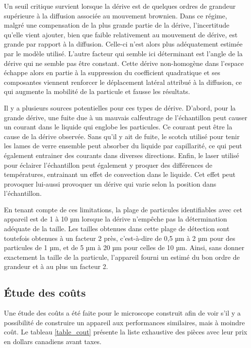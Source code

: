 \documentclass[11pt,letterpaper]{article}
\begin{document}
Un seuil critique survient lorsque la dérive est de quelques ordres de grandeur supérieure à la 
diffusion associée au mouvement brownien. Dans ce régime, malgré une 
compensation de la plus grande partie de la dérive, l'incertitude qu'elle vient ajouter, bien que faible
relativement au mouvement de dérive, est grande par rapport à la diffusion. Celle-ci n'est alors plus 
adéquatement estimée par le modèle utilisé. L'autre facteur qui semble ici déterminant est l'angle de la
dérive qui ne semble pas être constant. Cette dérive non-homogène dans l'espace échappe alors en partie
à la suppression du coefficient quadratique et ses composantes viennent renforcer le déplacement latéral
attribué à la diffusion, ce qui augmente la mobilité de la particule et fausse les résultats. 

Il y a plusieurs sources potentielles pour ces types de dérive. D'abord, pour la grande dérive, une 
fuite due à un mauvais calfeutrage de l'échantillon peut causer un courant dans le liquide qui englobe 
les particules. Ce courant peut être la cause de la dérive observée. Sans qu'il y ait de fuite, le scotch
utilisé pour tenir les lames de verre ensemble peut absorber du liquide par capillarité, ce qui peut 
également entrainer des courants dans diverses directions. Enfin, le laser utilisé pour éclairer l'échantillon
peut également y proquer des différences de températures, entrainant un effet de convection dans le liquide.
Cet effet peut provoquer lui-aussi provoquer un dérive qui varie selon la position dans l'échantillon. 

En tenant compte de ces limitations, la plage de particules identifiables avec cet appareil est de 1 à 10 µm
lorsque la dérive n'empêche pas la détermination adéquate de la taille. Les tailles obtenues dans cette plage 
de détection sont toutefois obtenues à un facteur 2 près, c'est-à-dire de 0,5 µm à 2 µm pour des particules de
1 µm, et de 5 µm à 20 µm pour celles de 10 µm. Ainsi, sans donner exactement la taille de la particule, 
l'appareil fourni un estimé du bon ordre de grandeur et à au plus un facteur 2.

\subsection{Étude des coûts}

Une étude des coûts a été faite pour le microscope construit afin de voir s'il y a possibilité
de construire un appareil aux performances similaires, mais à moindre coût. Le tableau \ref{table_cout}
présente la liste exhaustive des pièces avec leur prix en dollars canadiens avant taxes.
\end{document}
